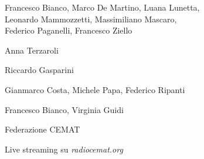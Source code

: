 \medskip

\textbf{}

Francesco Bianco, Marco De Martino, Luana Lunetta, \\ Leonardo Mammozzetti,  Massimiliano Mascaro, \\ Federico Paganelli, Francesco Ziello

\medskip

\textbf{}

Anna Terzaroli

\medskip

\textbf{}

Riccardo Gasparini

\medskip

\textbf{}

Gianmarco Costa, Michele Papa, Federico Ripanti

\medskip

\textbf{}

Francesco Bianco, Virginia Guidi

\vfill

\textbf{}

Federazione CEMAT

Live streaming su \emph{radiocemat.org}